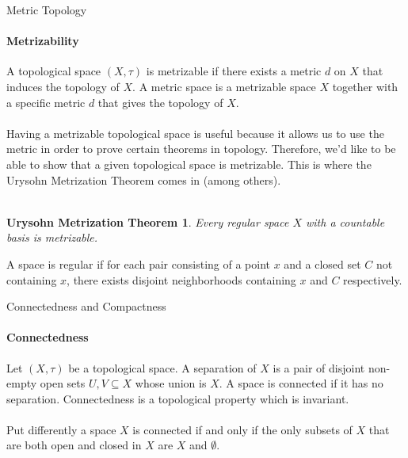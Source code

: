 \documentclass[pdf]{beamer}
\begin{document}
    \begin{frame}{Metric Topology}
        \framesubtitle{Metrizability}
        \newtheorem{thrm:urysohn}{Urysohn Metrization Theorem}

        A topological space $(X, \tau)$ is {\color{red} metrizable} if there exists a metric $d$ on $X$
        that induces the topology of $X$. A metric space is a metrizable space $X$ together with a
        specific metric $d$ that gives the topology of $X$. \\~\\

        Having a metrizable topological space is useful because it allows us to use the metric
        in order to prove certain theorems in topology. Therefore, we'd like to be able to show
        that a given topological space is metrizable. This is where the {\color{red} Urysohn 
        Metrization Theorem} comes in (among others). \\~\\

        \begin{thrm:urysohn}
            Every regular space $X$ with a countable basis is metrizable.
        \end{thrm:urysohn}

        A space is {\color{red} regular} if for each pair consisting of a point $x$ and a closed set
        $C$ not containing $x$, there exists disjoint neighborhoods containing $x$ and $C$ respectively.

    \end{frame}

    \begin{frame}{Connectedness and Compactness}
        \framesubtitle{Connectedness}

        Let $(X, \tau)$ be a topological space. A {\color{red} separation} of $X$ is a pair of disjoint
        non-empty open sets $U, V \subseteq X$ whose union is $X$. A space is {\color{red} connected} 
        if it has no separation. Connectedness is a topological property which is invariant. \\~\\

        Put differently a space $X$ is connected if and only if the only subsets of $X$ that are
        both open and closed in $X$ are $X$ and $\emptyset$. \\~\\
        
    \end{frame}
\end{document}
